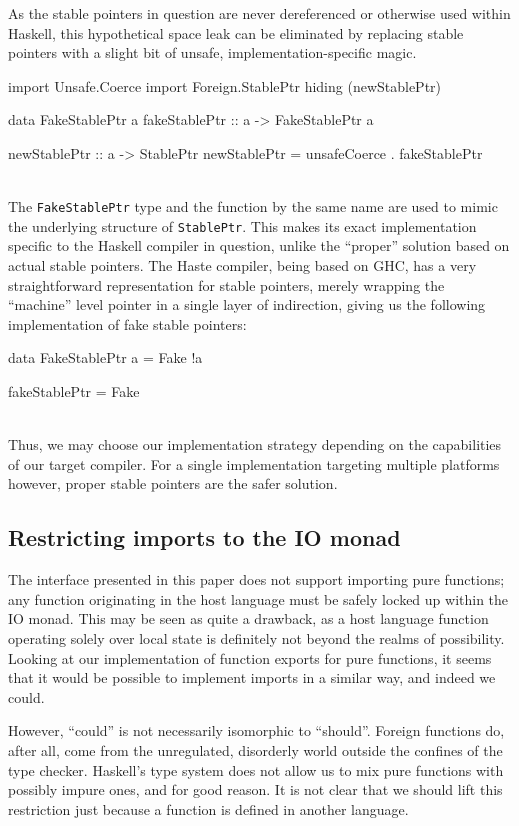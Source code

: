 \documentclass[preprint]{sigplanconf}
\begin{document}
As the stable pointers in question are never dereferenced or otherwise
used within Haskell, this hypothetical space leak can be eliminated by
replacing stable pointers with a slight bit of unsafe, implementation-specific
magic.\\
\begin{code}
  import Unsafe.Coerce
  import Foreign.StablePtr hiding (newStablePtr)

  data FakeStablePtr a
  fakeStablePtr :: a -> FakeStablePtr a

  newStablePtr :: a -> StablePtr
  newStablePtr = unsafeCoerce . fakeStablePtr
\end{code}\\
The \lstinline!FakeStablePtr! type and the function by the same name are used
to mimic the underlying structure of \lstinline!StablePtr!. This makes its
exact implementation specific to the Haskell compiler in question, unlike
the ``proper'' solution based on actual stable pointers. The Haste
compiler, being based on GHC, has a very straightforward representation for
stable pointers, merely wrapping the ``machine'' level pointer in a single
layer of indirection, giving us the following implementation of fake stable
pointers:\\
\begin{code}
  data FakeStablePtr a = Fake !a

  fakeStablePtr = Fake
\end{code}\\
Thus, we may choose our implementation strategy depending on the capabilities
of our target compiler. For a single implementation targeting multiple
platforms however, proper stable pointers are the safer solution.

\subsection{Restricting imports to the IO monad}
The interface presented in this paper does not support importing pure
functions; any function originating in the host language must be safely locked
up within the IO monad. This may be seen as quite a drawback, as a host
language function operating solely over local state is definitely not
beyond the realms of possibility. Looking at our implementation of function
exports for pure functions, it seems that it would be possible to implement
imports in a similar way, and indeed we could.

However, ``could'' is not necessarily isomorphic to ``should''.
Foreign functions do, after all, come from the unregulated, disorderly world
outside the confines of the type checker. Haskell's type system does not
allow us to mix pure functions with possibly impure ones, and for good
reason. It is not clear that we should lift this
restriction just because a function is defined in another language.
\end{document}
